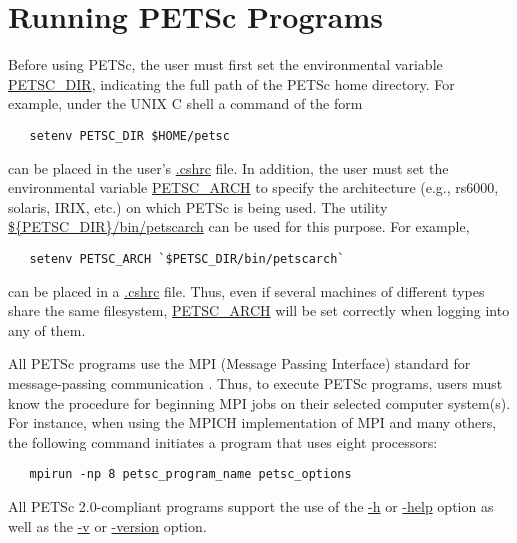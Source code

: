 \section{Running PETSc Programs}
\label{sec:running}

Before using PETSc, the user must first set the environmental variable
\url{PETSC_DIR},  indicating the full path of the PETSc home
directory.  For example, under the UNIX C shell a command of the form
\begin{verbatim}
   setenv PETSC_DIR $HOME/petsc
\end{verbatim}
 can be placed in the user's \url{
.cshrc} file.  In addition, the user must set the environmental
variable \url{PETSC_ARCH} to specify the architecture (e.g., rs6000,
solaris, IRIX, etc.)  on which PETSc is being used.  The utility
 \url{${PETSC_DIR}/bin/petscarch} can be used for this purpose.  For example,
\begin{verbatim}
   setenv PETSC_ARCH `$PETSC_DIR/bin/petscarch`
\end{verbatim}
can be placed in a \url{.cshrc} file.  Thus, even if several machines of different
types share the same filesystem, \url{PETSC_ARCH} will be set correctly
when logging into any of them. 

All PETSc programs use the MPI (Message Passing Interface) standard
for message-passing communication \cite{MPI-final}.  Thus, to execute
PETSc programs, users must know the procedure for beginning MPI jobs
on their selected computer system(s).  For instance, when using the
MPICH implementation of MPI \cite{mpich-web-page} and many others, the following
command initiates a program that uses eight processors:
  
\begin{verbatim}
   mpirun -np 8 petsc_program_name petsc_options
\end{verbatim}


All PETSc 2.0-compliant programs support the use of the \url{-h}
 or \url{-help} option as well as the \url{-v} 
or \url{-version} option. 


